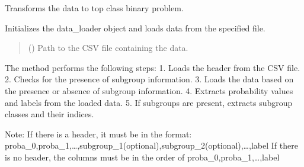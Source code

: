 \documentclass[letterpaper,10pt,english]{sphinxmanual}
\begin{document}
\begin{fulllineitems}
\begin{fulllineitems}
\end{fulllineitems}


\begin{fulllineitems}
\label{\detokenize{calzone:calzone.utils.data_loader.transform_topclass}}
\pysigstartsignatures
{}
\pysigstopsignatures
\sphinxAtStartPar
Transforms the data to top class binary problem.

\end{fulllineitems}


\begin{fulllineitems}
\label{\detokenize{calzone:id0}}
\pysigstartsignatures
{}
\pysigstopsignatures
\sphinxAtStartPar
Initializes the data\_loader object and loads data from the specified file.
\begin{quote}\begin{description}
\sphinxAtStartPar
{} () \textendash{} Path to the CSV file containing the data.

\end{description}\end{quote}

\sphinxAtStartPar
The method performs the following steps:
1. Loads the header from the CSV file.
2. Checks for the presence of subgroup information.
3. Loads the data based on the presence or absence of subgroup information.
4. Extracts probability values and labels from the loaded data.
5. If subgroups are present, extracts subgroup classes and their indices.

\sphinxAtStartPar
Note:
\sphinxhyphen{} If there is a header, it must be in the format: proba\_0,proba\_1,…,subgroup\_1(optional),subgroup\_2(optional),…,label
\sphinxhyphen{} If there is no header, the columns must be in the order of proba\_0,proba\_1,…,label

\end{fulllineitems}


\end{fulllineitems}
\end{document}

